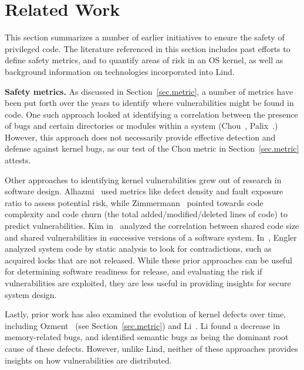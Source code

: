 \section{Related Work}
\label{sec.related_work}

This section summarizes a number of earlier initiatives to ensure the safety of
 privileged code. %
The literature referenced in this section includes past efforts to define safety metrics,
and to quantify areas of risk in an OS kernel, as well as background information
 on technologies incorporated into Lind.

\textbf{Safety metrics.}
 
As discussed in Section~\ref{sec.metric}, a number of metrics have been put forth over the years to identify where vulnerabilities might be found in code.
One such approach looked at identifying a correlation between the presence of bugs
and certain directories or modules within a system (Chou~\cite{PittSFIeld},
Palix~\cite{palix2011faults}.)
However, this approach does not necessarily
provide effective detection and defense against kernel bugs, as our test of the
Chou metric in Section~\ref{sec.metric} attests.

Other approaches to identifying kernel vulnerabilities grew out of research in
software design.
Alhazmi~\cite{alhazmi2008application}
used metrics like defect density and fault exposure ratio to assess potential risk,
while Zimmermann~\cite{zimmermann2010searching}
 pointed towards code complexity and code churn (the total added/modified/deleted
lines of code) to predict vulnerabilities. Kim in~\cite{kim2007vulnerability} analyzed
the correlation between shared code size and shared vulnerabilities in
successive versions of a software system. In~\cite{engler2001bugs}, Engler analyzed
system code by static analysis to look for contradictions, such as acquired locks that are
not released. While
these prior approaches can be useful for determining software readiness for release, and
evaluating the risk if vulnerabilities are exploited,
they are less useful in providing insights for secure system design.

Lastly, prior work has also examined the evolution of kernel defects over time, including
Ozment~\cite{ozment2006milk} (see Section~\ref{sec.metric}) and Li~\cite{li2006have}.
Li found a decrease in memory-related
bugs, and identified semantic bugs as being the dominant root cause of these
defects.
However, unlike Lind, neither of these approaches provides insights
on how vulnerabilities are distributed.

